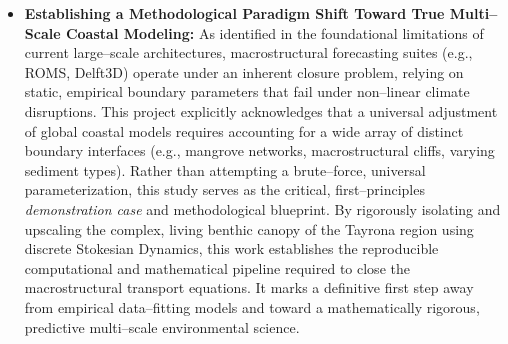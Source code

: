 \begin{itemize}
    \item \textbf{Establishing a Methodological Paradigm Shift Toward True Multi--Scale Coastal Modeling:} As identified in the foundational limitations of current large--scale architectures, macrostructural forecasting suites (e.g., ROMS, Delft3D) operate under an inherent closure problem, relying on static, empirical boundary parameters that fail under non--linear climate disruptions. This project explicitly acknowledges that a universal adjustment of global coastal models requires accounting for a wide array of distinct boundary interfaces (e.g., mangrove networks, macrostructural cliffs, varying sediment types). Rather than attempting a brute--force, universal parameterization, this study serves as the critical, first--principles \emph{demonstration case} and methodological blueprint. By rigorously isolating and upscaling the complex, living benthic canopy of the Tayrona region using discrete Stokesian Dynamics, this work establishes the reproducible computational and mathematical pipeline required to close the macrostructural transport equations. It marks a definitive first step away from empirical data--fitting models and toward a mathematically rigorous, predictive multi--scale environmental science.
\end{itemize}
